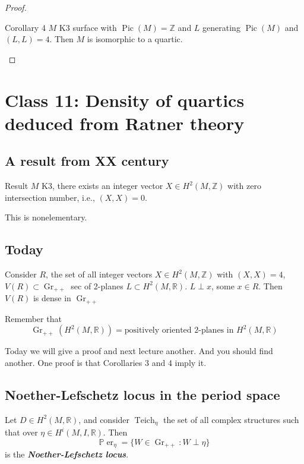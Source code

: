 \begin{proof}
\begin{idea6}{Corollary 4}\leavevmode
	$M$ K3 surface with $\operatorname{Pic}(M) =\mathbb{Z}$ and $L$ generating  $\operatorname{Pic}(M)$ and $(L,L)=4$. Then  $M$ is isomorphic to a quartic.
\end{idea6}
\end{proof}

\section{Class 11: Density of quartics deduced from Ratner theory}

\subsection{A result from XX century}

\begin{idea1}{Result}\leavevmode
	$M$ K3, there exists an integer vector $X\in H^{2}(M,\mathbb{Z})$ with zero intersection number, i.e., $(X,X)=0$.
\end{idea1}

This is nonelementary.

\subsection{Today}
Consider $R$, the set of all integer vectors  $X\in H^{2}(M,\mathbb{Z})$ with $(X,X)=4$,  $V(R)\subset \operatorname{Gr}_{++}$ sec of 2-planes $L \subset H^{2}(M,\mathbb{R})$. $L\perp x$, some $x\in R$. Then $V(R)$ is dense in $\operatorname{Gr}_{+ +}$

Remember that
\[\operatorname{Gr}_{++}(H^{2}(M,\mathbb{R}))=\text{positively oriented 2-planes in }H^{2}(M,\mathbb{R}) \]

Today we will give a proof and next lecture another. And you should find another. One proof is that Corollaries 3 and 4 imply it.

\subsection{Noether-Lefschetz locus in the period space}

\begin{defn}\leavevmode
	Let $D\in H^{2}(M,\mathbb{R})$, and consider $\operatorname{Teich}_\eta$ the set of all complex structures such that over $\eta\in H^i(M,I,\mathbb{R})$. Then
	 \[\mathbb{P}\operatorname{er}_\eta=\{W\in\operatorname{Gr}_{++}:W\perp \eta\}\]
	 is the \textit{\textbf{Noether-Lefschetz locus}}.
\end{defn}

